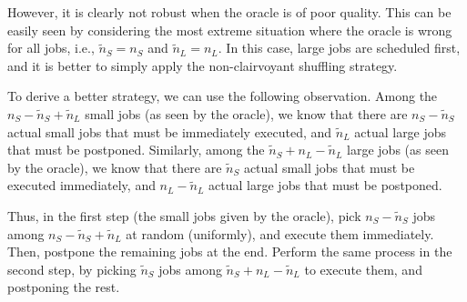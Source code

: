 \documentclass{article}
\begin{document}
However, it is clearly not robust when the oracle is of poor quality. This can be easily seen by
considering the most extreme situation where the oracle is wrong for all jobs, i.e.,
\(\tilde{n}_S=n_S\) and \(\tilde{n}_L=n_L\). In this case, large jobs are scheduled first, and it is
better to simply apply the non-clairvoyant shuffling strategy.


To derive a better strategy, we can use the following observation. Among the
\(n_S-\tilde{n}_S+\tilde{n}_L\) small jobs (as seen by the oracle), we know that there are
\(n_S-\tilde{n}_S\) actual small jobs that must be immediately executed, and \(\tilde{n}_L\) actual
large jobs that must be postponed. Similarly, among the \(\tilde{n}_S+n_L-\tilde{n}_L\) large jobs
(as seen by the oracle), we know that there are \(\tilde{n}_S\) actual small jobs that must be
executed immediately, and \(n_L-\tilde{n}_L\) actual large jobs that must be postponed.

Thus, in the first step (the small jobs given by the oracle), pick \(n_S-\tilde{n}_S\) jobs among
\(n_S-\tilde{n}_S+\tilde{n}_L\) at random (uniformly), and execute them immediately. Then, postpone
the remaining jobs at the end. Perform the same process in the second step, by picking
\(\tilde{n}_S\) jobs among \(\tilde{n}_S+n_L-\tilde{n}_L\) to execute them, and postponing the rest.
\end{document}

